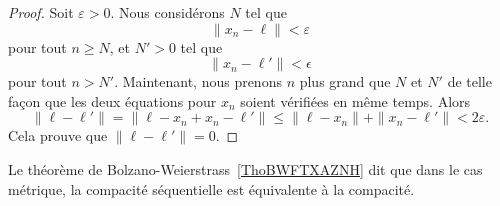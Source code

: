 \begin{proof}
	Soit \( \varepsilon>0\). Nous considérons \( N\) tel que
	\begin{equation}
		\| x_n-\ell \|<\varepsilon
	\end{equation}
	pour tout \( n\geq N\), et \( N'>0\) tel que
	\begin{equation}
		\| x_n-\ell' \|<\epsilon
	\end{equation}
	pour tout \( n>N'\). Maintenant, nous prenons \( n\) plus grand que \( N\) et \( N'\) de telle façon que les deux équations pour \( x_n\) soient vérifiées en même temps. Alors
	\begin{equation}
		\| \ell-\ell' \|=\| \ell-x_n+x_n-\ell' \|\leq\| \ell-x_n \|+\| x_n-\ell' \|<2\varepsilon.
	\end{equation}
	Cela prouve que \( \| \ell-\ell' \|=0\).
\end{proof}
Le théorème de Bolzano-Weierstrass~\ref{ThoBWFTXAZNH} dit que dans le cas métrique, la compacité séquentielle est équivalente à la compacité.

